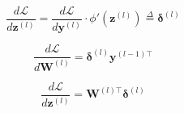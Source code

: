 \documentclass[10pt]{article}
\theoremstyle{definition}
\begin{document}
\begin{equation*}
\frac{d\mathcal{L}}{d\mathbf{z}^{(l)}} = \frac{d\mathcal{L}}{d\mathbf{y}^{(l)}} \cdot \phi'(\mathbf{z}^{(l)}) \overset{\Delta}{=} \pmb{\delta}^{(l)}
\end{equation*}

\begin{equation*}
\frac{d\mathcal{L}}{d\mathbf{W}^{(l)}} = \pmb{\delta}^{(l)}\mathbf{y}^{(l-1)\top}
\end{equation*}

\begin{equation*}
\frac{d\mathcal{L}}{d\mathbf{z}^{(l)}} = \mathbf{W}^{(l)\top} \pmb{\delta}^{(l)}
\end{equation*}
\end{document}
